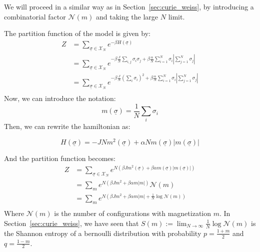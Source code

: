 We will proceed in a similar way as in Section~\ref{sec:curie_weiss}, by introducing a combinatorial factor $\mathcal{N}(m)$ and taking the large $N$ limit.

The partition function of the model is given by:
\begin{equation}
    \begin{aligned}
        Z &= \sum_{\underline{\sigma}\in\mathcal{X}_N}e^{-\beta H(\underline{\sigma})}\\
        &= \sum_{\underline{\sigma}\in\mathcal{X}_N}e^{-\beta\frac{J}{N}\sum_{i,j}\sigma_i\sigma_j + \beta\frac{\alpha}{N}\sum_{i=1}^N \sigma_i \left | \sum_{j=1}^N \sigma_j \right |}\\
        &= \sum_{\underline{\sigma}\in\mathcal{X}_N}e^{-\beta\frac{J}{N}\left(\sum_{i}\sigma_i\right)^2 + \beta\frac{\alpha}{N}\sum_{i=1}^N \sigma_i \left | \sum_{j=1}^N \sigma_j \right |}\\
    \end{aligned}
\end{equation}
Now, we can introduce the notation:
\begin{equation}
m(\underline{\sigma}) = \frac{1}{N}\sum_{i}\sigma_i
\end{equation}
Then, we can rewrite the hamiltonian as:

\begin{equation}
    H(\underline{\sigma}) =  - J N m^2(\underline{\sigma}) + \alpha N m(\underline{\sigma}) \left| m(\underline{\sigma}) \right|
\end{equation}

And the partition function becomes:
\begin{equation}
    \begin{aligned}
        Z &= \sum_{\underline{\sigma}\in\mathcal{X}_N}e^{N\left(\beta J  m^2(\underline{\sigma})+\beta \alpha  m(\underline{\sigma}) \left| m(\underline{\sigma})\right|\right)}\\
        &= \sum_{m}e^{N\left(\beta J  m^2+\beta \alpha  m \left| m\right|\right)}\mathcal{N}(m)\\
        &= \sum_{m}e^{N\left(\beta J  m^2+\beta \alpha  m \left| m\right| + \frac{1}{N}\log \mathcal{N}(m)\right)}\\
    \end{aligned}
\end{equation}
Where $\mathcal{N}(m)$ is the number of configurations with magnetization $m$. In Section~\ref{sec:curie_weiss}, we have seen that $S(m) :=\lim_{N\rightarrow\infty}\frac{1}{N}\log \mathcal{N}(m)$ is the Shannon entropy of a bernoulli distribution with probability $p = \frac{1+m}{2}$ and $q = \frac{1-m}{2}$.

